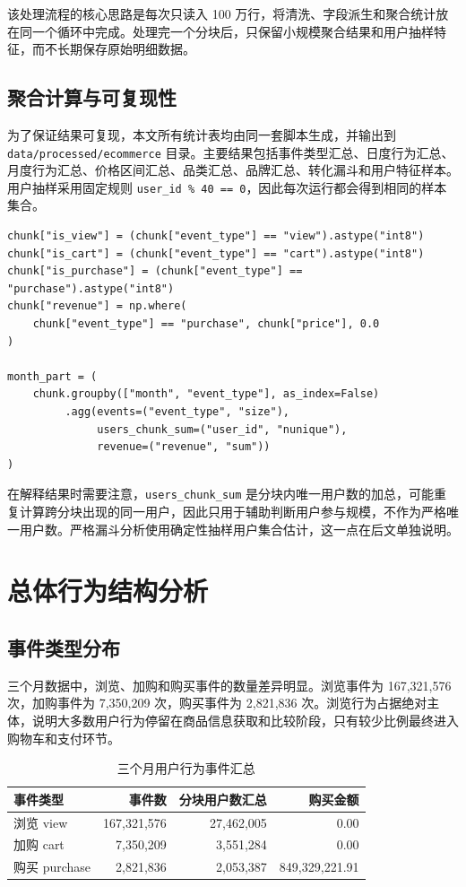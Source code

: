 \documentclass[12pt,hyperref,a4paper,UTF8]{ctexart}
\begin{document}
该处理流程的核心思路是每次只读入 100 万行，将清洗、字段派生和聚合统计放在同一个循环中完成。处理完一个分块后，只保留小规模聚合结果和用户抽样特征，而不长期保存原始明细数据。

\subsection{聚合计算与可复现性}

为了保证结果可复现，本文所有统计表均由同一套脚本生成，并输出到 \texttt{data/processed/ecommerce} 目录。主要结果包括事件类型汇总、日度行为汇总、月度行为汇总、价格区间汇总、品类汇总、品牌汇总、转化漏斗和用户特征样本。用户抽样采用固定规则 \texttt{user\_id \% 40 == 0}，因此每次运行都会得到相同的样本集合。

\begin{lstlisting}[caption={按行为类型和月份聚合的代码示例}]
chunk["is_view"] = (chunk["event_type"] == "view").astype("int8")
chunk["is_cart"] = (chunk["event_type"] == "cart").astype("int8")
chunk["is_purchase"] = (chunk["event_type"] == "purchase").astype("int8")
chunk["revenue"] = np.where(
    chunk["event_type"] == "purchase", chunk["price"], 0.0
)

month_part = (
    chunk.groupby(["month", "event_type"], as_index=False)
         .agg(events=("event_type", "size"),
              users_chunk_sum=("user_id", "nunique"),
              revenue=("revenue", "sum"))
)
\end{lstlisting}

在解释结果时需要注意，\texttt{users\_chunk\_sum} 是分块内唯一用户数的加总，可能重复计算跨分块出现的同一用户，因此只用于辅助判断用户参与规模，不作为严格唯一用户数。严格漏斗分析使用确定性抽样用户集合估计，这一点在后文单独说明。

\section{总体行为结构分析}

\subsection{事件类型分布}

三个月数据中，浏览、加购和购买事件的数量差异明显。浏览事件为 167,321,576 次，加购事件为 7,350,209 次，购买事件为 2,821,836 次。浏览行为占据绝对主体，说明大多数用户行为停留在商品信息获取和比较阶段，只有较少比例最终进入购物车和支付环节。

\begin{table}[H]
\centering
\caption{三个月用户行为事件汇总}
\begin{tabular}{lrrr}
\toprule
事件类型 & 事件数 & 分块用户数汇总 & 购买金额 \\
\midrule
浏览 view & 167,321,576 & 27,462,005 & 0.00 \\
加购 cart & 7,350,209 & 3,551,284 & 0.00 \\
购买 purchase & 2,821,836 & 2,053,387 & 849,329,221.91 \\
\bottomrule
\end{tabular}
\end{table}
\end{document}
